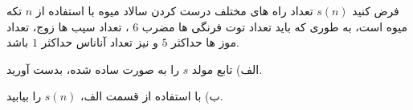 \exercise
فرض کنید 
$s(n)$
 تعداد راه های مختلف درست کردن سالاد میوه با استفاده از 
$n$
  تکه میوه است، به طوری که باید تعداد توت فرنگی ها مضرب 
$6$
  ، تعداد سیب ها زوج، تعداد موز ها حداکثر 
$5$
   و نیز تعداد آناناس حداکثر 
$1$
    باشد.
    
    الف) تابع مولد 
$s$
     را به صورت ساده شده، بدست آورید. 
     
     ب) با استفاده از قسمت الف،
$s(n)$
      را بیابید.